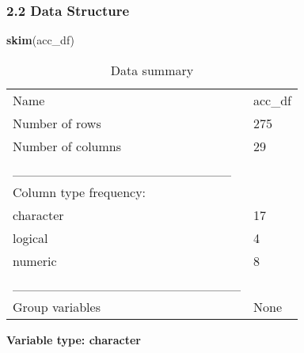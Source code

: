 \documentclass[
]{article}
\newenvironment{Shaded}{\begin{snugshade}}{\end{snugshade}}
\newcommand{\FunctionTok}[1]{\textcolor[rgb]{0.13,0.29,0.53}{\textbf{#1}}}
\newcommand{\NormalTok}[1]{#1}
\begin{document}
\subsubsection{2.2 Data Structure}\label{data-structure}

\begin{Shaded}
\begin{Highlighting}[]
\FunctionTok{skim}\NormalTok{(acc\_df)}
\end{Highlighting}
\end{Shaded}

\begin{longtable}[]{@{}ll@{}}
\caption{Data summary}\tabularnewline
\toprule\noalign{}
\endfirsthead
\endhead
\bottomrule\noalign{}
\endlastfoot
Name & acc\_df \\
Number of rows & 275 \\
Number of columns & 29 \\
\_\_\_\_\_\_\_\_\_\_\_\_\_\_\_\_\_\_\_\_\_\_\_ & \\
Column type frequency: & \\
character & 17 \\
logical & 4 \\
numeric & 8 \\
\_\_\_\_\_\_\_\_\_\_\_\_\_\_\_\_\_\_\_\_\_\_\_\_ & \\
Group variables & None \\
\end{longtable}

\textbf{Variable type: character}
\end{document}
